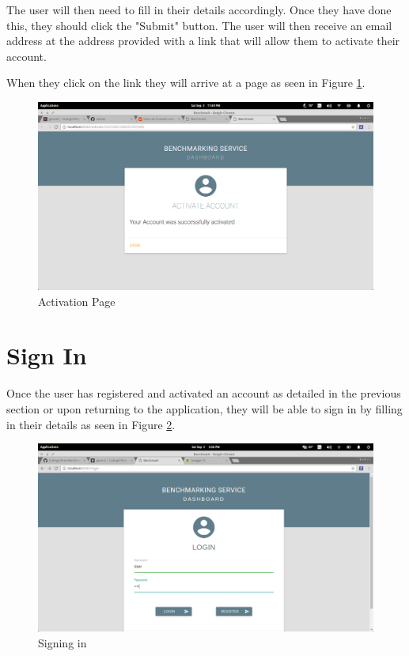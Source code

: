 \documentclass[11pt,a4paper]{article}
\begin{document}
The user will then need to fill in their details accordingly. Once they have done this, they should click the "Submit" 
button. The user will then receive an email address at the address provided with a link that will allow them to activate
their account.
 
\clearpage When they click on the link they will arrive at a page as seen in Figure \ref{fig:activatePage}.
\begin{figure}[H]
	\begin{center}
		\includegraphics[scale=0.3]{../Images/User Manual/Activation Page.png}
		\caption{Activation Page}
		\label{fig:activatePage}
	\end{center}  
\end{figure}

\clearpage
\section{Sign In}
Once the user has registered and activated an account as detailed in the previous section or upon returning to the application,
they will be able to sign in by filling in their details as seen in Figure \ref{fig:signPage}.
\begin{figure}[H]
	\begin{center}
		\includegraphics[scale=0.3]{../Images/User Manual/Sign in Page.png}
		\caption{Signing in}
		\label{fig:signPage}
	\end{center}  
\end{figure}
\end{document}
